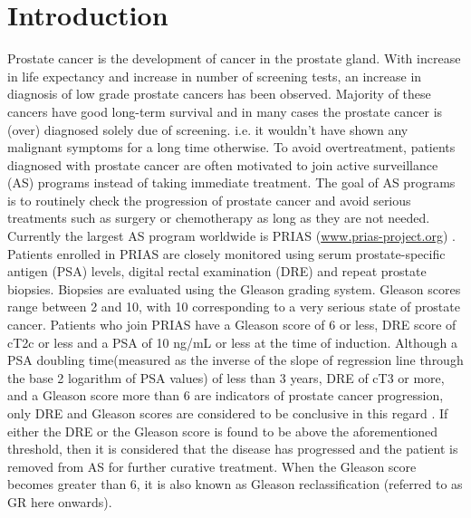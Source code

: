 
\section{Introduction}
\label{sec : introduction}
Prostate cancer is the development of cancer in the prostate gland. With increase in life expectancy and increase in number of screening tests, an increase in diagnosis of low grade prostate cancers has been observed. Majority of these cancers have good long-term survival and in many cases the prostate cancer is (over) diagnosed solely due of screening. i.e. it wouldn't have shown any malignant symptoms for a long time otherwise. To avoid overtreatment, patients diagnosed with prostate cancer are often motivated to join active surveillance (AS) programs instead of taking immediate treatment. The goal of AS programs is to routinely check the progression of prostate cancer and avoid serious treatments such as surgery or chemotherapy as long as they are not needed.\\

Currently the largest AS program worldwide is PRIAS (\url{www.prias-project.org}) \citep{bokhorst2015compliance}. Patients enrolled in PRIAS are closely monitored using serum prostate-specific antigen (PSA) levels, digital rectal examination (DRE) and repeat prostate biopsies. Biopsies are evaluated using the Gleason grading system. Gleason scores range between 2 and 10, with 10 corresponding to a very serious state of prostate cancer. Patients who join PRIAS have a Gleason score of 6 or less, DRE score of cT2c or less and a PSA of 10 ng/mL or less at the time of induction. Although a PSA doubling time(measured as the inverse of the slope of regression line through the base 2 logarithm of PSA values) of less than 3 years, DRE of cT3 or more, and a Gleason score more than 6 are indicators of prostate cancer progression, only DRE and Gleason scores are considered to be conclusive in this regard \citep{bokhorst2016decade}. If either the DRE or the Gleason score is found to be above the aforementioned threshold, then it is considered that the disease has progressed and the patient is removed from AS for further curative treatment. When the Gleason score becomes greater than 6, it is also known as Gleason reclassification (referred to as GR here onwards).\\

